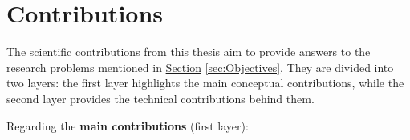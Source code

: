 

\section{Contributions}\label{sec:Contributions}

The scientific contributions from this thesis aim to provide answers to the research problems mentioned in \hyperref[sec:Objectives]{Section} \ref{sec:Objectives}. They are divided into two layers: the first layer highlights the main conceptual contributions, while the second layer provides the technical contributions behind them. 

Regarding the \textbf{main contributions} (first layer):

